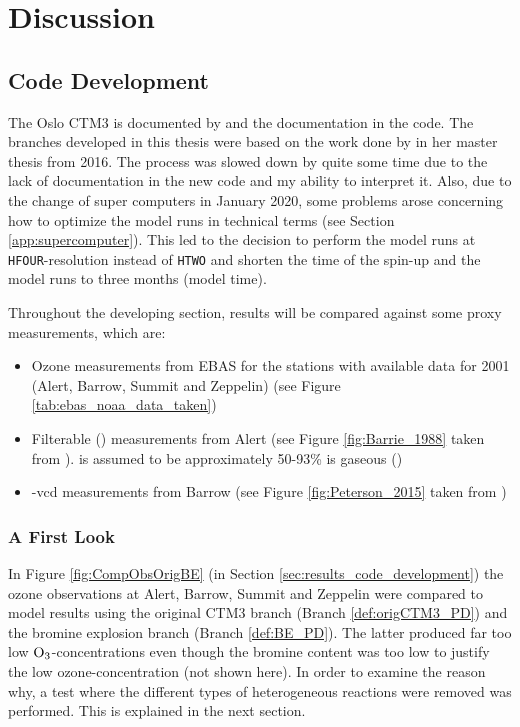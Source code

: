 \setcounter{chapter}{6}
\chapter{Discussion}\label{chap:discussion}

\section{Code Development}\label{sec:discussion_code_development}

The Oslo CTM3 is documented by \cite{SovdeManual} and the documentation in the code. The branches developed in this thesis were based on the work done by \cite{Susanne} in her master thesis from 2016. The process was slowed down by quite some time due to the lack of documentation in the new code and my ability to interpret it. Also, due to the change of super computers in January 2020, some problems arose concerning how to optimize the model runs in technical terms (see Section \ref{app:supercomputer}). This led to the decision to perform the model runs at \texttt{HFOUR}-resolution instead of \texttt{HTWO} and shorten the time of the spin-up and the model runs to three months (model time). 

\medskip

Throughout the developing section, results will be compared against some proxy measurements, which are: 

\begin{itemize}
    \item Ozone measurements from EBAS for the stations with available data for 2001 (Alert, Barrow, Summit and Zeppelin) (see Figure \ref{tab:ebas_noaa_data_taken})
    \item Filterable  () measurements from Alert (see Figure \ref{fig:Barrie_1988} taken from \cite{barrie}).  is assumed to be approximately 50-93\% is gaseous  (\cite{barrie})
    \item {}-\acrlong{vcd} measurements from Barrow (see Figure \ref{fig:Peterson_2015} taken from \cite{Peterson2015})
\end{itemize}

\subsection{A First Look}

In Figure \ref{fig:CompObsOrigBE} (in Section \ref{sec:results_code_development}) the ozone observations at Alert, Barrow, Summit and Zeppelin were compared to model results using the original CTM3 branch (Branch \ref{def:origCTM3_PD}) and the bromine explosion branch (Branch \ref{def:BE_PD}). The latter produced far too low $\mathrm{O_3}$-concentrations even though the bromine content was too low to justify the low ozone-concentration (not shown here). In order to examine the reason why, a test where the different types of heterogeneous reactions were removed was performed. This is explained in the next section. 

